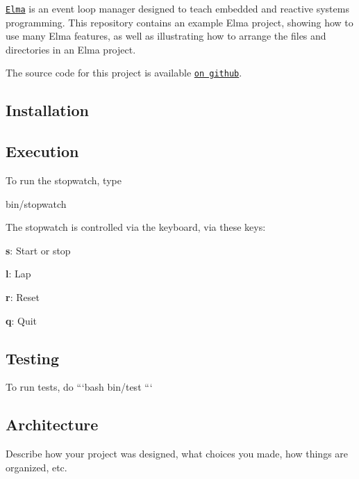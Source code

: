 \href{http://klavinslab.org/elma}{\tt Elma} is an event loop manager designed to teach embedded and reactive systems programming. This repository contains an example Elma project, showing how to use many Elma features, as well as illustrating how to arrange the files and directories in an Elma project.

The source code for this project is available \href{https://github.com/klavinslab/elma_project}{\tt on github}.

\subsection*{Installation }



\subsection*{Execution }

To run the stopwatch, type \begin{DoxyVerb}bin/stopwatch
\end{DoxyVerb}


The stopwatch is controlled via the keyboard, via these keys\+:
\begin{DoxyItemize}
\item {\bfseries s}\+: Start or stop
\item {\bfseries l}\+: Lap
\item {\bfseries r}\+: Reset
\item {\bfseries q}\+: Quit
\end{DoxyItemize}

\subsection*{Testing }

To run tests, do ```bash bin/test ```

\subsection*{Architecture }

Describe how your project was designed, what choices you made, how things are organized, etc.

